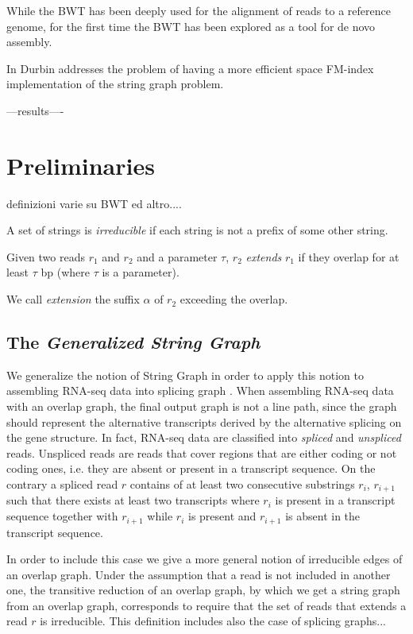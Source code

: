 \documentclass[runningheads,envcountsame,a4paper]{llncs}
\begin{document}
While the BWT has been deeply used for the alignment of reads to a reference genome, for the first time the BWT has been explored as a tool for de novo assembly.

In \cite{Simpson10} Durbin addresses the problem of having a more efficient space FM-index implementation of the string graph problem.

---results----





\section{Preliminaries}


definizioni varie su BWT ed altro....


A set of strings is \emph{irreducible} if each string is not a prefix of some other string.
\begin{definition}
Given two reads $r_1$ and $r_2$ and a parameter $\tau$, $r_2$ \emph{extends} $r_1$ if they overlap for at least $\tau$ bp (where $\tau$ is a parameter).
\end{definition}
We call \emph{extension} the suffix $\alpha$ of $r_2$ exceeding the overlap.

\subsection*{The \emph{Generalized String Graph}}

We generalize the notion of String Graph in order to apply this notion to   assembling RNA-seq data into splicing graph \cite{Simpson10, Simpson12}.
When assembling RNA-seq data with an overlap graph, the final output graph is not a line path, since the graph should represent the alternative transcripts derived by the alternative splicing
on the gene structure. In fact, RNA-seq data are classified into {\em spliced} and  {\em  unspliced} reads. Unspliced reads are reads that cover regions that are either coding or not coding ones, i.e. they are absent or present in a transcript sequence. On the contrary a  spliced read $r$ contains  of  at least two consecutive substrings   $r_i $, $r_{i+1}$ such that  there exists at least two transcripts where  $r_i$ is present in a transcript sequence  together with $r_{i+1}$ while $r_i$ is present and $r_{i+1}$ is absent in the transcript sequence.

In order to include this case we give a more general notion of irreducible edges of an overlap graph. Under the assumption that a read is not included in another one, the transitive reduction of an overlap graph, by which we get a string graph from an overlap graph, corresponds to require that the set of reads that extends a read $r$ is irreducible. This definition includes also the case of  splicing graphs...
\end{document}

